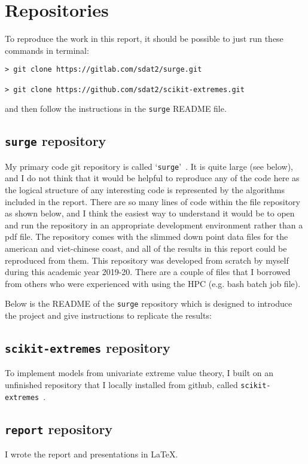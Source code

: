\section{Repositories}
To reproduce the work in this report, it should be possible to just run these
commands in terminal:

\begin{verbatim}
> git clone https://gitlab.com/sdat2/surge.git

> git clone https://github.com/sdat2/scikit-extremes.git

\end{verbatim}

and then follow the instructions in the \texttt{surge} README file.

\subsection{\texttt{surge} repository}

My primary code git repository is called `\texttt{surge}'~\cite{gitlab}.
It is quite large (see below), and I do not think that it would be helpful to reproduce any of the code here
as the logical structure of any interesting code is represented by the
algorithms included in the report. There are so many lines of code within the file
repository as shown below, and I think the easiest way to understand it would be to open
and run the repository in an appropriate development environment rather than a pdf file.
The repository comes with the slimmed down point data files for the american and
viet-chinese coast, and all of the results in this report could be reproduced from them.
This repository was developed from scratch by myself during this academic year 2019-20.
There are a couple of files that I borrowed from others who were
experienced with using the HPC (e.g. bash batch job file).




Below is the README of the \texttt{surge} repository which is designed to
introduce the project and give instructions to replicate the results:



\subsection{\texttt{scikit-extremes} repository}

To implement models from univariate extreme value theory, I built
on an unfinished repository that I locally installed from github,
called \texttt{scikit-extremes}~\cite{skextremes}.



\subsection{\texttt{report} repository}

I wrote the report and presentations in \LaTeX.


